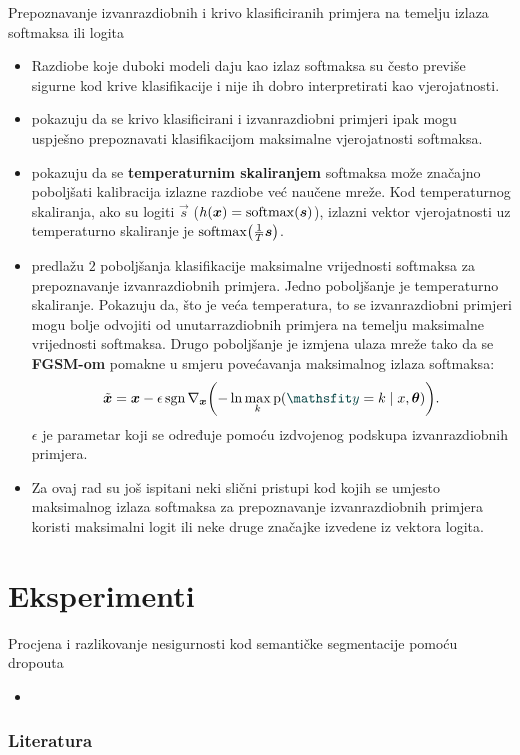 \documentclass{beamer}
\begin{document}
\begin{frame}[allowframebreaks=0.9]{Prepoznavanje izvanrazdiobnih i krivo klasificiranih primjera na temelju izlaza softmaksa ili logita}
\begin{itemize}
	\item Razdiobe koje duboki modeli daju kao izlaz softmaksa su često previše sigurne kod krive klasifikacije i nije ih dobro interpretirati kao vjerojatnosti.
	\item \citet{Hendrycks:2016:BDMOODE} pokazuju da se krivo klasificirani i izvanrazdiobni primjeri ipak mogu uspješno prepoznavati klasifikacijom maksimalne vjerojatnosti softmaksa. 
	\item \citet{Guo:2017:CMNN} pokazuju da se \textbf{temperaturnim skaliranjem} softmaksa može značajno poboljšati kalibracija izlazne razdiobe već naučene mreže. Kod temperaturnog skaliranja, ako su logiti $\vec s$ ($h(\vec x)=\softmax(\vec s)$), izlazni vektor vjerojatnosti uz temperaturno skaliranje je $\softmax\del{\frac{1}{T}\vec s}$.	
	\item \citet{Liang:2017:PDOODENN} predlažu $2$ poboljšanja klasifikacije maksimalne vrijednosti softmaksa za prepoznavanje izvanrazdiobnih primjera. Jedno poboljšanje je temperaturno skaliranje. Pokazuju da, što je veća temperatura, to se izvanrazdiobni primjeri mogu bolje odvojiti od unutarrazdiobnih primjera na temelju maksimalne vrijednosti softmaksa. Drugo poboljšanje je izmjena ulaza mreže tako da se \textbf{FGSM-om} pomakne u smjeru povećavanja maksimalnog izlaza softmaksa:
	\begin{equation} \label{eq:ODIN-FGSM}
	\tilde{\vec x} = \vec x - \epsilon\sgn\nabla_{\vec x}\del{-\ln \max_k \p(\rvar y=k\mid x,\vec\theta)} \text{.}
	\end{equation}
	$\epsilon$ je parametar koji se određuje pomoću izdvojenog podskupa izvanrazdiobnih primjera.		
	\item Za ovaj rad su još ispitani neki slični pristupi kod kojih se umjesto maksimalnog izlaza softmaksa za prepoznavanje izvanrazdiobnih primjera koristi maksimalni logit ili neke druge značajke izvedene iz vektora logita.
\end{itemize}
\end{frame}


\section{Eksperimenti}

\begin{frame}[allowframebreaks=0.9]{Procjena i razlikovanje nesigurnosti kod semantičke segmentacije pomoću dropouta}
\begin{itemize}
	\item 
\end{itemize}
\end{frame}

\begin{frame}[allowframebreaks=0.9]
\frametitle{Literatura}
	
	 
\end{frame}
\end{document}
